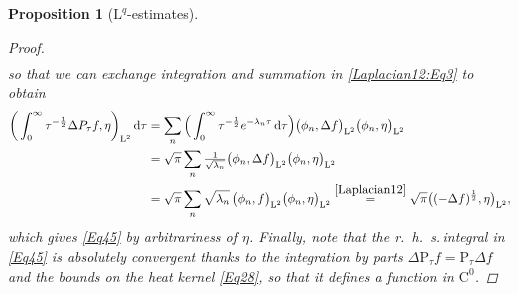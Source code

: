 \documentclass[11pt,a4paper,oneside]{amsart}
\numberwithin{equation}{section}
\newtheorem{proposition}[theorem]{Proposition}
\newcommand{\cc}{\text{C}}
\newcommand{\dd}{\mathrm{d}}
\newcommand{\LL}{\mathrm{L}}
\newcommand{\rhs}{r.~h.~s.\,}
\newcommand{\pp}{\mathrm{P}}
\begin{document}
\begin{proposition}[$\LL^{q}$-estimates]
\begin{proof}
\begin{align*}
%
\end{align*}
%
so that we can exchange integration and summation in \eqref{Laplacian12:Eq3} to obtain
%
\begin{align*}
%
\bigg(\int_{0}^{\infty}\tau^{-\frac{1}{2}}\Delta {\rm P}_{\tau} f,\eta\bigg)_{\LL^{2}}\,\dd\tau&=\sum_n\Big(\int_{0}^{\infty}\tau^{-\frac{1}{2}}e^{-\lambda_n\tau}\,\dd\tau\Big)\big(\phi_n,\Delta f\big)_{\LL^2}\big(\phi_n,\eta\big)_{\LL^2}\\
&=\sqrt{\pi}\sum_n \tfrac{1}{\sqrt{\lambda_n}}\big(\phi_n,\Delta f\big)_{\LL^2}\big(\phi_n,\eta\big)_{\LL^2}\\
&=\sqrt{\pi}\sum_n \sqrt{\lambda_n}\,\big(\phi_n, f\big)_{\LL^2}\big(\phi_n,\eta\big)_{\LL^2}\stackrel{\eqref{Laplacian12}}{=}\sqrt{\pi}\big((-\Delta f)^{\frac{1}{2}},\eta\big)_{\LL^2},
%
\end{align*}
%
which gives \eqref{Eq45} by arbitrariness of $\eta$. Finally, note that the \rhs integral in \eqref{Eq45} is absolutely convergent thanks to the integration by parts $\Delta \pp_\tau f=\pp_{\tau}\Delta f$ and the bounds on the heat kernel \eqref{Eq28}, so that it defines a function in $\cc^0$.
%
\medskip
%



\end{proof}
\end{proposition}
\end{document}
